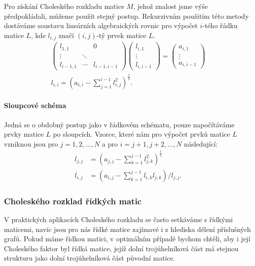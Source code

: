 \documentclass[11pt,american,czech,oneside]{book}
\theoremstyle{plain}
\theoremstyle{definition}
\begin{document}
Pro získání Choleského rozkladu matice $M$, jehož znalost jsme výše předpokládali, můžeme použít stejný postup. Rekurzivním použitím této metody dostáváme soustavu lineárních algebraických rovnic pro výpočet $i$-tého řádku matice $L$, kde $l_{i,j}$ značí $(i,j)$-tý prvek matice $L$.
\begin{gather*}
\begin{pmatrix}
  l_{1,1} &  & 0 \\
  \vdots  & \ddots &  \\
  l_{i-1,1} & \cdots & l_{i-1,i-1}
\end{pmatrix}
\begin{pmatrix}
  l_{i,1} \\
  \vdots \\
  l_{i,i-1}
\end{pmatrix}
=
\begin{pmatrix}
  a_{i,1} \\
  \vdots \\
  a_{i,i-1}
\end{pmatrix} \\
 l_{i,i} = \left(a_{i,i} - \sum_{j=1}^{i-1}{l_{i,j}^2}\right)^\frac12.
\end{gather*}

\paragraph{Sloupcové schéma}
Jedná se o obdobný postup jako v řádkovém schématu, pouze napočítáváme prvky matice $L$ po sloupcích. Vzorce, které nám pro výpočet prvků matice $L$ vzniknou jsou pro $j = 1,2,\ldots, N$ a pro $i = j+1,j+2,\ldots,N$ následující:
\begin{align*}
  l_{j,j} &= \left(a_{j,j} - \sum_{k=1}^{j-1}{l_{j,k}^2}\right)^\frac12 \\
  l_{i,j} &= \left(a_{i,j} - \sum_{k=1}^{j-1}{l_{i,k}l_{j,k}}\right)/l_{j,j}.
\end{align*}

\subsubsection{Choleského rozklad řídkých matic}
\label{Choleskysparse}

V praktických aplikacích Choleského rozkladu se často setkáváme s řídkými maticemi, navíc jsou pro nás řídké matice zajímavé i z hlediska dělení příslušných grafů. Pokud máme řídkou matici, v optimálním případě bychom chtěli, aby i její Choleského faktor byl řídká matice, jejíž dolní trojúhelníková část má stejnou strukturu jako dolní trojúhelníková část původní matice.
\end{document}

